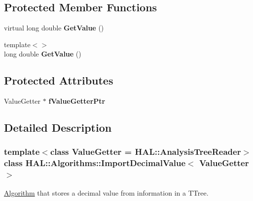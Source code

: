 \subsection*{Protected Member Functions}
\begin{DoxyCompactItemize}
\item 
\hypertarget{class_h_a_l_1_1_algorithms_1_1_import_decimal_value_aae4465d8f212108ed5e243dff94cc759}{virtual long double {\bfseries Get\+Value} ()}\label{class_h_a_l_1_1_algorithms_1_1_import_decimal_value_aae4465d8f212108ed5e243dff94cc759}

\item 
\hypertarget{class_h_a_l_1_1_algorithms_1_1_import_decimal_value_a187f1af68a06e50376af1c2c78a6d02f}{{\footnotesize template$<$$>$ }\\long double {\bfseries Get\+Value} ()}\label{class_h_a_l_1_1_algorithms_1_1_import_decimal_value_a187f1af68a06e50376af1c2c78a6d02f}

\end{DoxyCompactItemize}
\subsection*{Protected Attributes}
\begin{DoxyCompactItemize}
\item 
\hypertarget{class_h_a_l_1_1_algorithms_1_1_import_decimal_value_abd097dd9e4459fe8c726305e602f1def}{Value\+Getter $\ast$ {\bfseries f\+Value\+Getter\+Ptr}}\label{class_h_a_l_1_1_algorithms_1_1_import_decimal_value_abd097dd9e4459fe8c726305e602f1def}

\end{DoxyCompactItemize}


\subsection{Detailed Description}
\subsubsection*{template$<$class Value\+Getter = H\+A\+L\+::\+Analysis\+Tree\+Reader$>$class H\+A\+L\+::\+Algorithms\+::\+Import\+Decimal\+Value$<$ Value\+Getter $>$}

\hyperlink{class_h_a_l_1_1_algorithm}{Algorithm} that stores a decimal value from information in a T\+Tree. 


